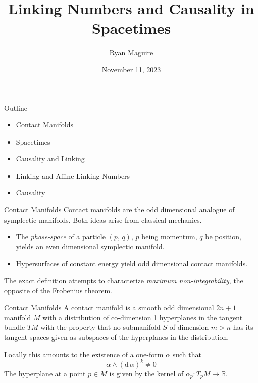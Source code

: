 \documentclass{beamer}
\title{Linking Numbers and Causality in Spacetimes}
\author{Ryan Maguire}
\date{November 11, 2023}
\begin{document}
    \maketitle
    \begin{frame}{Outline}
        \begin{itemize}
            \item Contact Manifolds
            \item Spacetimes
            \item Causality and Linking
            \item Linking and Affine Linking Numbers
            \item Causality
        \end{itemize}
    \end{frame}
    \begin{frame}{Contact Manifolds}
        Contact manifolds are the odd dimensional analogue of symplectic
        manifolds. Both ideas arise from classical mechanics.
        \begin{itemize}
            \item
                The \textit{phase-space} of a particle $(p,\,q)$, $p$ being
                momentum, $q$ be position, yields an even dimensional symplectic
                manifold.
            \item
                Hypersurfaces of constant energy yield odd dimensional contact
                manifolds.
        \end{itemize}
        The exact definition attempts to characterize
        \textit{maximum non-integrability}, the opposite of the
        Frobenius theorem.
    \end{frame}
    \begin{frame}{Contact Manifolds}
        A contact manifold is a smooth odd dimensional $2n+1$ manifold $M$ with
        a distribution of co-dimension 1 hyperplanes in the tangent bundle $TM$
        with the property that no submanifold $S$ of dimension $m>n$ has
        its tangent spaces given as subspaces of the hyperplanes in the
        distribution.
        \par\hfill\par
        Locally this amounts to the existence of a one-form $\alpha$ such that
        \begin{equation}
            \alpha\land(\textrm{d}\,\alpha)^{k}\ne{0}
        \end{equation}
        The hyperplane at a point $p\in{M}$ is given by the kernel of
        $\alpha_{p}:T_{p}M\rightarrow\mathbb{R}$.
    \end{frame}
\end{document}
